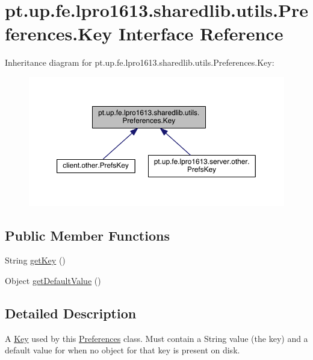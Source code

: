 \hypertarget{interfacept_1_1up_1_1fe_1_1lpro1613_1_1sharedlib_1_1utils_1_1_preferences_1_1_key}{}\section{pt.\+up.\+fe.\+lpro1613.\+sharedlib.\+utils.\+Preferences.\+Key Interface Reference}
\label{interfacept_1_1up_1_1fe_1_1lpro1613_1_1sharedlib_1_1utils_1_1_preferences_1_1_key}


Inheritance diagram for pt.\+up.\+fe.\+lpro1613.\+sharedlib.\+utils.\+Preferences.\+Key\+:
\nopagebreak
\begin{figure}[H]
\begin{center}
\leavevmode
\includegraphics[width=350pt]{interfacept_1_1up_1_1fe_1_1lpro1613_1_1sharedlib_1_1utils_1_1_preferences_1_1_key__inherit__graph}
\end{center}
\end{figure}
\subsection*{Public Member Functions}
\begin{DoxyCompactItemize}
\item 
String \hyperlink{interfacept_1_1up_1_1fe_1_1lpro1613_1_1sharedlib_1_1utils_1_1_preferences_1_1_key_af244cecb8edad1f87eaaa517c3590507}{get\+Key} ()
\item 
Object \hyperlink{interfacept_1_1up_1_1fe_1_1lpro1613_1_1sharedlib_1_1utils_1_1_preferences_1_1_key_aa78c759626a4e04578befd149e4c7310}{get\+Default\+Value} ()
\end{DoxyCompactItemize}


\subsection{Detailed Description}
A \hyperlink{interfacept_1_1up_1_1fe_1_1lpro1613_1_1sharedlib_1_1utils_1_1_preferences_1_1_key}{Key} used by this \hyperlink{classpt_1_1up_1_1fe_1_1lpro1613_1_1sharedlib_1_1utils_1_1_preferences}{Preferences} class. Must contain a String value (the key) and a default value for when no object for that key is present on disk. 

